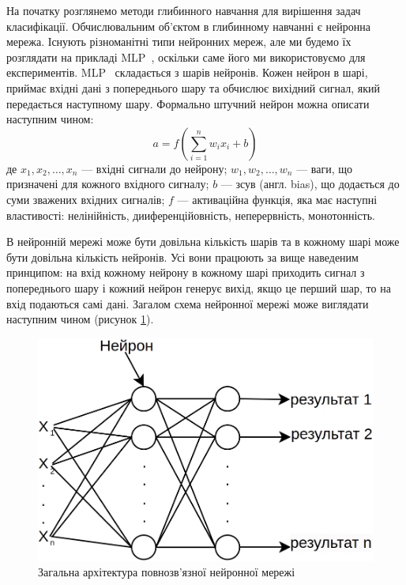 На початку розглянемо методи глибинного навчання для вирішення задач класифікації. Обчислювальним об'єктом в глибинному навчанні є нейронна мережа. Існують різноманітні типи нейронних мереж, але ми будемо їх розглядати на прикладі MLP~\cite{ct26}, оскільки саме його ми використовуємо для експериментів. MLP~\cite{ct26} складається з шарів нейронів. Кожен нейрон в шарі, приймає вхідні дані з попереднього шару та обчислює вихідний сигнал, який передається наступному шару. Формально штучний нейрон можна описати наступним чином:
\begin{equation}
\label{eq:neuron}
	a = f\left(\sum_{i=1}^n w_i x_i + b \right)
\end{equation}
де \(x_1, x_2, \ldots, x_n\) — вхідні сигнали до нейрону; \(w_1, w_2, \ldots, w_n\) — ваги, що призначені для кожного вхідного сигналу; \(b\) — зсув (англ. bias), що додається до суми зважених вхідних сигналів; \(f\) — активаційна функція, яка має наступні властивості: нелінійність, дииференційовність, неперервність, монотонність. 

В нейронній мережі може бути довільна кількість шарів та в кожному шарі може бути довільна кількість нейронів. Усі вони працюють за вище наведеним принципом: на вхід кожному нейрону в кожному шарі приходить сигнал з попереднього шару і кожний нейрон генерує вихід, якщо це перший шар, то на вхід подаються самі дані. Загалом схема нейронної мережі може виглядати наступним чином (рисунок \ref{fig_nn_arch}).

\begin{figure}[ht]
	\centering
	\includegraphics[scale=0.5]{Images/neural_network_architecture.png}
	\caption{Загальна архітектура повнозв'язної нейронної мережі}
	\label{fig_nn_arch}
\end{figure}


